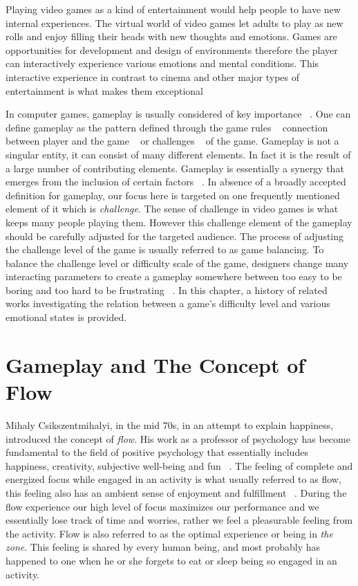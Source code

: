
Playing video games as a kind of entertainment would help people to have new internal experiences. The virtual world of video games let adults to play as new rolls and enjoy filling their heads with new thoughts and emotions. Games are opportunities for development and design of environments therefore the player can interactively experience various emotions and mental conditions. This interactive experience in contrast to cinema and other major types of entertainment is what makes them exceptional

In computer games, gameplay is usually considered of key importance ~\cite{rollings2006fundamentals, malone1982makes}. One can define gameplay as the pattern defined through the game rules ~\cite{salen2004rules, pajares2008understanding} connection between player and the game ~\cite{laramee2002game} or challenges ~\cite{rollings2003andrew} of the game. Gameplay is not a singular entity, it can consist of many different elements. In fact it is the result of a large number of contributing elements. Gameplay is essentially a synergy that emerges from the inclusion of certain factors ~\cite{rollings2003andrew}. In absence of a broadly accepted definition for gameplay, our focus here is targeted on one frequently mentioned element of it which is \textit{challenge}. The sense of challenge in video games is what keeps many people playing them. However this challenge element of the gameplay should be carefully adjusted for the targeted audience. The process of adjusting the challenge level of the game is usually referred to as game balancing. To balance the challenge level or difficulty scale of the game, designers change many interacting parameters to create a gameplay somewhere between too easy to be boring and too hard to be frustrating ~\cite{koster2013theory}. In this chapter, a history of related works investigating the relation between a game's difficulty level and various emotional states is provided.

\section{Gameplay and The Concept of Flow}

Mihaly Csikszentmihalyi, in the mid 70s, in an attempt to explain happiness, introduced the concept of \textit{flow}. His work as a professor of psychology has become fundamental to the field of positive psychology that essentially includes happiness, creativity, subjective well-being and fun ~\cite{csikszentmihalyi1990flow}. The feeling of complete and energized focus while engaged in an activity is what usually referred to as flow, this feeling also has an ambient sense of enjoyment and fulfillment ~\cite{csikszentmihalyi1990flow}. During the flow experience our high level of focus maximizes our performance and we essentially lose track of time and worries, rather we feel a pleasurable feeling from the activity. Flow is also referred to as the optimal experience or being in \textit{the zone}. This feeling is shared by every human being, and most probably has happened to one when he or she forgets to eat or sleep being so engaged in an activity.

